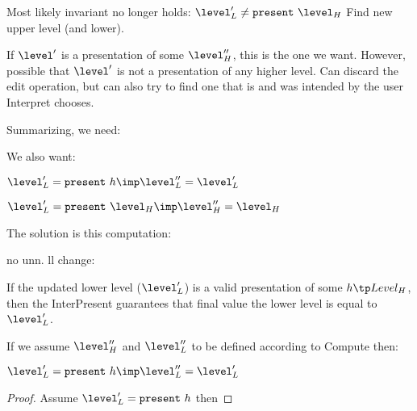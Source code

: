 \bl
\* Most likely invariant no longer holds: $\level'_{L} \neq \present~\level_{H}$
\* Find new upper level (and lower).
\el

\bl 
\* If  $\level'$ is a presentation of some $\level''_H$, this is the one we want.
\* However, possible that $\level'$ is not a presentation of any higher level. 
\* Can discard the edit operation, but can also try to find one that is and was intended by the user
\* Interpret chooses.
\el

Summarizing, we need:


We also want:

$\level'_L = \present~h \imp \level''_{L} = \level'_{L}$ 


$\level'_L = \present~\level_H \imp \level''_{H} = \level_{H}$


The solution is this computation: 


no unn. ll change:

If the updated lower level ($\level'_{L}$) is a valid presentation of some $h \tp Level_H$, then the {\sc InterPresent} guarantees that final value the lower level is equal to $\level'_{L}$.

If we assume $\level''_{H}$ and $\level''_{L}$ to be defined according to {\sc Compute} then:

$\level'_L = \present~h \imp \level''_{L} = \level'_{L}$

\begin{proof} Assume $\level'_L = \present~h$ then
\end{proof}


